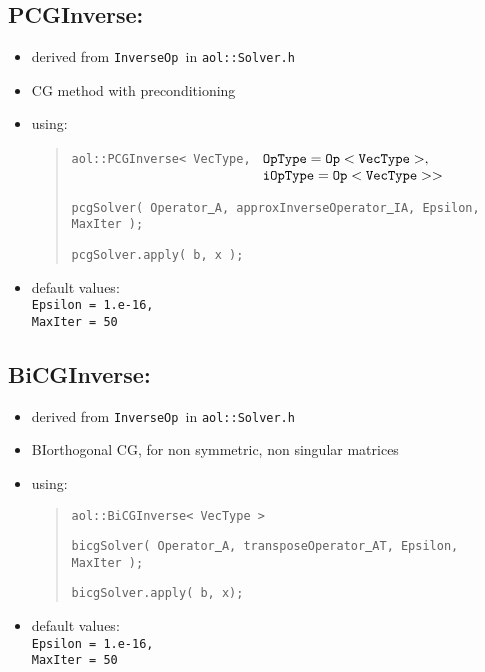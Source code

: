 
\subsection{ PCGInverse: }
\begin{itemize}
\item derived from {\tt InverseOp }in {\tt aol::Solver.h}
\item CG method with preconditioning
\item using: \begin{quote}
{\tt aol::PCGInverse< VecType,}
$\begin{array}[t]{l}
{\tt OpType = Op< VecType >,} \\ {\tt iOpType = Op< VecType > > }
\end{array}$
\begin{flushright} {\tt pcgSolver( Operator\underline{ }A, approxInverseOperator\underline{ }IA, Epsilon, MaxIter ); }
\end{flushright}
{\tt pcgSolver.apply( b, x );} \end{quote}
\item default values: \\
{\tt Epsilon = 1.e-16, \\ MaxIter = 50}
\end{itemize}


\subsection{ BiCGInverse:}
\begin{itemize}
\item derived from {\tt InverseOp }in {\tt aol::Solver.h}
\item BIorthogonal CG, for non symmetric, non singular matrices
\item using: \begin{quote}
{\tt aol::BiCGInverse< VecType > }
\begin{flushright} {\tt bicgSolver( Operator\underline{ }A, transposeOperator\underline{ }AT, Epsilon, MaxIter );} \end{flushright}
{\tt bicgSolver.apply( b, x); } \end{quote}
\item default values: \\
{\tt Epsilon = 1.e-16, \\ MaxIter = 50}
\end{itemize}

